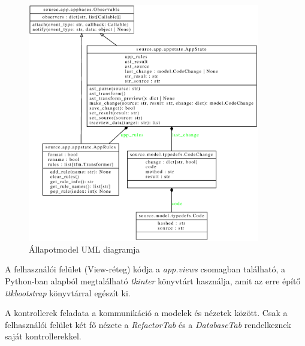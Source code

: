 \begin{figure}[H]
	\centering
	\includegraphics[width=0.9\textwidth]{images/uml/AppState.eps}
	\caption{Állapotmodel UML diagramja}
\end{figure}

\pagebreak

A felhasználói felület (View-réteg) kódja a \emph{app.views} csomagban található,
a Python-ban alapból megtalálható \emph{tkinter} könyvtárt használja, amit az 
erre építő \emph{ttkbootstrap} könyvtárral egészít ki.

A kontrollerek feladata a kommunikáció a modelek és nézetek között.
Csak a felhasználói felület két fő nézete
a \emph{RefactorTab} és a \emph{DatabaseTab} 
rendelkeznek saját kontrollerekkel.